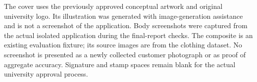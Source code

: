 The cover uses the previously approved conceptual artwork and original university
logo. Its illustration was generated with image-generation assistance and is
not a screenshot of the application. Body screenshots were captured from the
actual isolated application during the final-report checks. The composite is
an existing evaluation fixture; its source images are from the clothing dataset.
No screenshot is presented as a newly collected customer photograph or as proof
of aggregate accuracy. Signature and stamp spaces remain blank for the actual
university approval process.
